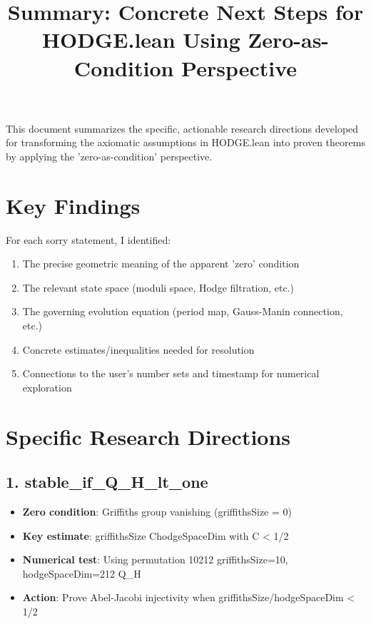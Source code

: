 \documentclass[11pt]{article}
\title{Summary: Concrete Next Steps for HODGE.lean Using Zero-as-Condition Perspective}
\author{}
\date{}
\begin{document}
\maketitle
This document summarizes the specific, actionable research directions developed for transforming the axiomatic assumptions in HODGE.lean into proven theorems by applying the 'zero-as-condition' perspective.

\section{Key Findings}

For each sorry statement, I identified:
\begin{enumerate}
\item The precise geometric meaning of the apparent 'zero' condition
\item The relevant state space (moduli space, Hodge filtration, etc.)
\item The governing evolution equation (period map, Gauss-Manin connection, etc.)
\item Concrete estimates/inequalities needed for resolution
\item Connections to the user's number sets and timestamp for numerical exploration
\end{enumerate}

\section{Specific Research Directions}

\subsection{1. stable\_if\_Q\_H\_lt\_one}
\begin{itemize}
\item \textbf{Zero condition}: Griffiths group vanishing (griffithsSize = 0)
\item \textbf{Key estimate}: griffithsSize \leq C\cdot hodgeSpaceDim with C < 1/2
\item \textbf{Numerical test}: Using permutation 10212 \rightarrow griffithsSize=10, hodgeSpaceDim=212 \rightarrow Q\_H
\item \textbf{Action}: Prove Abel-Jacobi injectivity when griffithsSize/hodgeSpaceDim < 1/2
\end{itemize}
\end{document}
